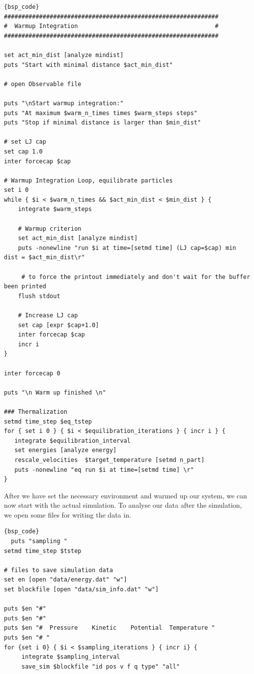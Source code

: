 \documentclass[
paper=a4,                       %
fontsize=11pt,                  %
twoside,                        %
footsepline,                    %
headsepline,                    %
headinclude=false,              %
footinclude=false,              %
pagesize,                       %
]{scrartcl}
\begin{document}
{\small\vspace{0,2cm}
\begin{lstlisting}[firstnumber=auto]{bsp_code}
#############################################################
#  Warmup Integration                                       #
#############################################################

set act_min_dist [analyze mindist]
puts "Start with minimal distance $act_min_dist"

# open Observable file

puts "\nStart warmup integration:"
puts "At maximum $warm_n_times times $warm_steps steps"
puts "Stop if minimal distance is larger than $min_dist"

# set LJ cap
set cap 1.0
inter forcecap $cap

# Warmup Integration Loop, equilibrate particles
set i 0
while { $i < $warm_n_times && $act_min_dist < $min_dist } {
    integrate $warm_steps

    # Warmup criterion
    set act_min_dist [analyze mindist]
    puts -nonewline "run $i at time=[setmd time] (LJ cap=$cap) min dist = $act_min_dist\r"
    
     # to force the printout immediately and don't wait for the buffer been printed
    flush stdout

    # Increase LJ cap
    set cap [expr $cap+1.0]
    inter forcecap $cap
    incr i
}

inter forcecap 0

puts "\n Warm up finished \n"

### Thermalization 
setmd time_step $eq_tstep
for { set i 0 } { $i < $equilibration_iterations } { incr i } {
   integrate $equilibration_interval
   set energies [analyze energy]
   rescale_velocities  $target_temperature [setmd n_part]
   puts -nonewline "eq run $i at time=[setmd time] \r"
}

\end{lstlisting}}\vspace{0,2cm}

\noindent After we have set the necessary environment and warmed up our system, we can now start with the actual 
simulation. To analyse our data after the simulation, we open some files for writing the data in. 

{\small\vspace{0,2cm}
\begin{lstlisting}[firstnumber=auto]{bsp_code}
  puts "sampling "
setmd time_step $tstep

# files to save simulation data
set en [open "data/energy.dat" "w"]
set blockfile [open "data/sim_info.dat" "w"]

puts $en "#"
puts $en "#"
puts $en "#  Pressure    Kinetic    Potential  Temperature "
puts $en "# "
for {set i 0} { $i < $sampling_iterations } { incr i} {
     integrate $sampling_interval
     save_sim $blockfile "id pos v f q type" "all"
\end{lstlisting}}\vspace{0,2cm}
\end{document}
